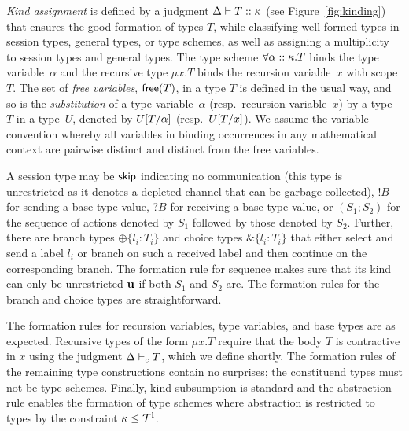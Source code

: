 


\emph{Kind assignment} is defined by a judgment $\Delta \vdash T
:: \kappa$ (see Figure~\ref{fig:kinding}) that
ensures the good formation of types $T$, while classifying well-formed
types in session types, general types, or type schemes, as well as
assigning a multiplicity to session types and general types.
%
The type scheme $\forall\alpha::\kappa.T$ binds the type
variable~$\alpha$ and the recursive type $\mu x.T$ binds the recursion
variable~$x$ with scope $T$.  The set of \emph{free variables}, $\mathsf{free}(T)$, in
a type $T$ is defined in the usual way, and so is the \emph{substitution}
of a type variable~$\alpha$ (resp.\ recursion variable~$x$) by a
type~$T$ in a type~$U$, denoted by $U[{T}/{\alpha}]$ (resp.\
$U[{T}/{x}]$).
%
We assume the variable convention whereby all variables in binding
occurrences in any mathematical context are pairwise distinct and
distinct from the free variables.

A session type may be $\mathsf{skip}$ indicating no communication (this type
is unrestricted as it denotes a depleted channel that can be garbage
collected), $!B$ for sending a base type value, $?B$ for receiving a
base type value, or $(S_1; S_2)$ for the sequence of actions denoted
by $S_1$ followed by those denoted by $S_2$. Further, there are branch
types $\oplus\{l_i:T_i\}$ and choice types $\&\{l_i:T_i\}$ that either
select and send a label $l_i$ or branch on such a received label and
then continue on the corresponding branch. The formation rule for
sequence makes sure that its kind can only be unrestricted
$\mathbf{u}$ if both $S_1$ and $S_2$ are. The formation rules for
the branch and choice types are straightforward.

The formation rules for recursion variables, type variables, and base
types are as expected.
Recursive types of the form $\mu x.T$ require that the body $T$ is
contractive in $x$ using the judgment $\Delta \vdash_{c} T$, %
which we define shortly. The formation rules of the remaining type
constructions contain no surprises; the constituend types must not be
type schemes.  Finally, kind subsumption is standard and the
abstraction rule enables the formation of type schemes where
abstraction is restricted to types by the constraint $\kappa
\le \mathcal T^{\mathbf{l}}$.

